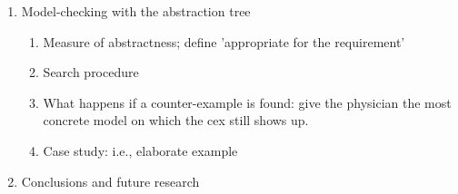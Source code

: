 \begin{enumerate}
	\item Model-checking with the abstraction tree
	\begin{enumerate}
		\item Measure of abstractness; define 'appropriate for the requirement'
		\item Search procedure
		\item What happens if a counter-example is found: give the physician the most concrete model on which the cex still shows up.
		\item Case study: i.e., elaborate example
	\end{enumerate}
	
	\item Conclusions and future research
	
\end{enumerate}


